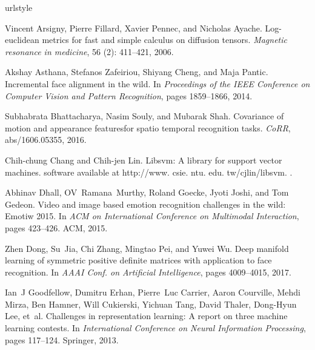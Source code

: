 \documentclass{bmvc2k}
\begin{document}
\begin{thebibliography}{29}
\providecommand{\natexlab}[1]{#1}
\providecommand{\url}[1]{\texttt{#1}}
\expandafter\ifx\csname urlstyle\endcsname\relax
  \providecommand{\doi}[1]{doi: #1}\else
  \providecommand{\doi}{doi: \begingroup \urlstyle{rm}\Url}\fi

Vincent Arsigny, Pierre Fillard, Xavier Pennec, and Nicholas Ayache.
\newblock Log-euclidean metrics for fast and simple calculus on diffusion
  tensors.
\newblock \emph{Magnetic resonance in medicine}, 56 (2):
  411--421, 2006.

Akshay Asthana, Stefanos Zafeiriou, Shiyang Cheng, and Maja Pantic.
\newblock Incremental face alignment in the wild.
\newblock In \emph{Proceedings of the IEEE Conference on Computer Vision and
  Pattern Recognition}, pages 1859--1866, 2014.

Subhabrata Bhattacharya, Nasim Souly, and Mubarak Shah.
\newblock Covariance of motion and appearance featuresfor spatio temporal
  recognition tasks.
\newblock \emph{CoRR}, abs/1606.05355, 2016.

Chih-chung Chang and Chih-jen Lin.
\newblock Libsvm: A library for support vector machines. software available at
  http://www. csie. ntu. edu. tw/cjlin/libsvm.
.

Abhinav Dhall, OV~Ramana~Murthy, Roland Goecke, Jyoti Joshi, and Tom Gedeon.
\newblock Video and image based emotion recognition challenges in the wild:
  Emotiw 2015.
\newblock In \emph{ACM on International Conference on Multimodal Interaction},
  pages 423--426. ACM, 2015.

Zhen Dong, Su~Jia, Chi Zhang, Mingtao Pei, and Yuwei Wu.
\newblock Deep manifold learning of symmetric positive definite matrices with
  application to face recognition.
\newblock In \emph{AAAI Conf. on Artificial Intelligence}, pages 4009--4015,
  2017.

Ian~J Goodfellow, Dumitru Erhan, Pierre~Luc Carrier, Aaron Courville, Mehdi
  Mirza, Ben Hamner, Will Cukierski, Yichuan Tang, David Thaler, Dong-Hyun Lee,
  et~al.
\newblock Challenges in representation learning: A report on three machine
  learning contests.
\newblock In \emph{International Conference on Neural Information Processing},
  pages 117--124. Springer, 2013.


\end{thebibliography}
\end{document}
